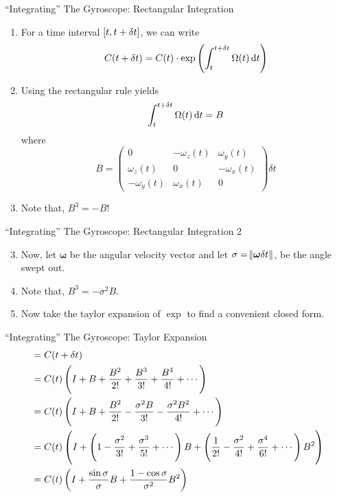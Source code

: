 \documentclass[10pt]{beamer}
\begin{document}
\begin{frame}{``Integrating'' The Gyroscope: Rectangular Integration}
  \begin{enumerate}
  \item For a time interval \(\intcc{t, t + \delta t}\), we can write
    \[C(t + \delta t) = C(t) \cdot \exp\del{\int_t^{t + \delta t} \Omega(t) \dif t}\]
  \item Using the rectangular rule yields
    \[\int_t^{t + \delta t} \Omega(t) \dif t = B\]
    where
    \[B =
      \begin{pmatrix}
        0 & -\omega_z(t) & \omega_y(t)\\ \omega_z(t) & 0 & -\omega_x(t) \\ -\omega_y(t) & \omega_x(t) & 0
      \end{pmatrix}\delta t
    \]
  \item Note that, \(B^3 = -B\)!
  \end{enumerate}
\end{frame}

\begin{frame}{``Integrating'' The Gyroscope: Rectangular Integration 2}
  \begin{enumerate}
    \setcounter{enumi}{2}
  \item Now, let \(\bm \omega\) be the angular velocity vector and let \(\sigma = \norm{\bm \omega \delta t}\), be the angle swept out.
  \item Note that, \(B^3 = -\sigma^2 B\).
  \item Now take the taylor expansion of \(\exp\) to find a convenient closed form.
  \end{enumerate}
\end{frame}

\begin{frame}{``Integrating'' The Gyroscope: Taylor Expansion}
  \begin{align*}
    &= C(t + \delta t)\\
     &= C(t)\del{I + B + \frac{B^2}{2!} + \frac{B^3}{3!} + \frac{B^4}{4!} + \cdots}\\
                  &= C(t)\del{I + B + \frac{B^2}{2!} - \frac{\sigma^2B}{3!} - \frac{\sigma^2B^2}{4!} + \cdots}\\
    &= C(t)\del{I + \del{1 - \frac{\sigma^2}{3!} + \frac{\sigma^3}{5!} + \cdots}B + \del{\frac{1}{2!} - \frac{\sigma^2}{4!} + \frac{\sigma^4}{6!} + \cdots}B^2}\\
    &= C(t)\del{I + \frac{\sin \sigma}{\sigma}B + \frac{1 - \cos\sigma}{\sigma^2}B^2}
  \end{align*}
\end{frame}
\end{document}
